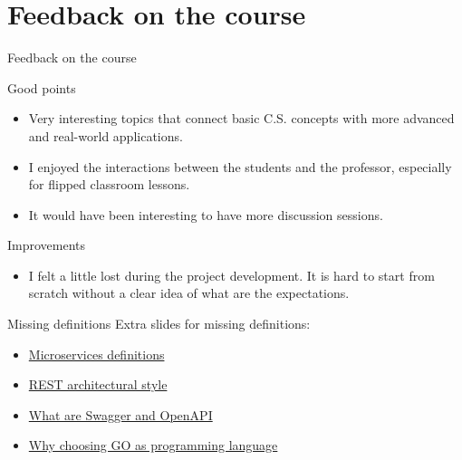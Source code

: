 \documentclass{beamer}
\begin{document}
\section{Feedback on the course}
\begin{frame}{Feedback on the course}
	\begin{block}{Good points}
		\begin{itemize}
			\item Very interesting topics that connect basic C.S. concepts with more advanced and real-world applications.
			\item I enjoyed the interactions between the students and the professor, especially for flipped classroom lessons.
			\item It would have been interesting to have more discussion sessions.
		\end{itemize}
	\end{block}
	\begin{block}{Improvements}
		\begin{itemize}
			\item I felt a little lost during the project development. It is hard to start from scratch without a clear idea of what are the expectations.
		\end{itemize}
	\end{block}
\end{frame}

\begin{frame}{Missing definitions}
	\label{index_1}
	Extra slides for missing definitions:
		\begin{itemize}
			\item \hyperlink{microservices_definitions}{Microservices definitions}
			\item \hyperlink{rest}{REST architectural style}
			\item \hyperlink{swagger_openapi}{What are Swagger and OpenAPI}
			\item \hyperlink{golang}{Why choosing GO as programming language}
		\end{itemize}
\end{frame}
\end{document}
